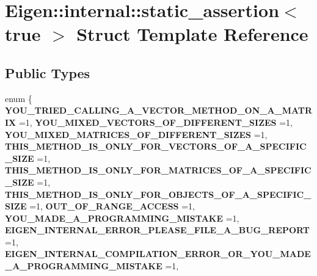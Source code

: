\hypertarget{struct_eigen_1_1internal_1_1static__assertion_3_01true_01_4}{}\section{Eigen\+::internal\+::static\+\_\+assertion$<$ true $>$ Struct Template Reference}
\label{struct_eigen_1_1internal_1_1static__assertion_3_01true_01_4}
\subsection*{Public Types}
\begin{DoxyCompactItemize}
\item 
\mbox{\label{struct_eigen_1_1internal_1_1static__assertion_3_01true_01_4_a39f5e9d0f36704f26349321883af718e}} 
enum \{ \newline
{\bfseries Y\+O\+U\+\_\+\+T\+R\+I\+E\+D\+\_\+\+C\+A\+L\+L\+I\+N\+G\+\_\+\+A\+\_\+\+V\+E\+C\+T\+O\+R\+\_\+\+M\+E\+T\+H\+O\+D\+\_\+\+O\+N\+\_\+\+A\+\_\+\+M\+A\+T\+R\+IX} =1, 
{\bfseries Y\+O\+U\+\_\+\+M\+I\+X\+E\+D\+\_\+\+V\+E\+C\+T\+O\+R\+S\+\_\+\+O\+F\+\_\+\+D\+I\+F\+F\+E\+R\+E\+N\+T\+\_\+\+S\+I\+Z\+ES} =1, 
{\bfseries Y\+O\+U\+\_\+\+M\+I\+X\+E\+D\+\_\+\+M\+A\+T\+R\+I\+C\+E\+S\+\_\+\+O\+F\+\_\+\+D\+I\+F\+F\+E\+R\+E\+N\+T\+\_\+\+S\+I\+Z\+ES} =1, 
{\bfseries T\+H\+I\+S\+\_\+\+M\+E\+T\+H\+O\+D\+\_\+\+I\+S\+\_\+\+O\+N\+L\+Y\+\_\+\+F\+O\+R\+\_\+\+V\+E\+C\+T\+O\+R\+S\+\_\+\+O\+F\+\_\+\+A\+\_\+\+S\+P\+E\+C\+I\+F\+I\+C\+\_\+\+S\+I\+ZE} =1, 
\newline
{\bfseries T\+H\+I\+S\+\_\+\+M\+E\+T\+H\+O\+D\+\_\+\+I\+S\+\_\+\+O\+N\+L\+Y\+\_\+\+F\+O\+R\+\_\+\+M\+A\+T\+R\+I\+C\+E\+S\+\_\+\+O\+F\+\_\+\+A\+\_\+\+S\+P\+E\+C\+I\+F\+I\+C\+\_\+\+S\+I\+ZE} =1, 
{\bfseries T\+H\+I\+S\+\_\+\+M\+E\+T\+H\+O\+D\+\_\+\+I\+S\+\_\+\+O\+N\+L\+Y\+\_\+\+F\+O\+R\+\_\+\+O\+B\+J\+E\+C\+T\+S\+\_\+\+O\+F\+\_\+\+A\+\_\+\+S\+P\+E\+C\+I\+F\+I\+C\+\_\+\+S\+I\+ZE} =1, 
{\bfseries O\+U\+T\+\_\+\+O\+F\+\_\+\+R\+A\+N\+G\+E\+\_\+\+A\+C\+C\+E\+SS} =1, 
{\bfseries Y\+O\+U\+\_\+\+M\+A\+D\+E\+\_\+\+A\+\_\+\+P\+R\+O\+G\+R\+A\+M\+M\+I\+N\+G\+\_\+\+M\+I\+S\+T\+A\+KE} =1, 
\newline
{\bfseries E\+I\+G\+E\+N\+\_\+\+I\+N\+T\+E\+R\+N\+A\+L\+\_\+\+E\+R\+R\+O\+R\+\_\+\+P\+L\+E\+A\+S\+E\+\_\+\+F\+I\+L\+E\+\_\+\+A\+\_\+\+B\+U\+G\+\_\+\+R\+E\+P\+O\+RT} =1, 
{\bfseries E\+I\+G\+E\+N\+\_\+\+I\+N\+T\+E\+R\+N\+A\+L\+\_\+\+C\+O\+M\+P\+I\+L\+A\+T\+I\+O\+N\+\_\+\+E\+R\+R\+O\+R\+\_\+\+O\+R\+\_\+\+Y\+O\+U\+\_\+\+M\+A\+D\+E\+\_\+\+A\+\_\+\+P\+R\+O\+G\+R\+A\+M\+M\+I\+N\+G\+\_\+\+M\+I\+S\+T\+A\+KE} =1, 

\end{DoxyCompactItemize}
